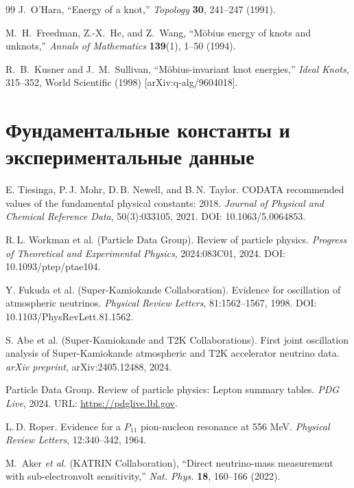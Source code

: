 \documentclass[11pt,a4paper]{article}
\begin{document}
\begin{thebibliography}{99}
		 J.~O'Hara, ``Energy of a knot,''
		\textit{Topology}
		\textbf{30}, 241--247 (1991).
		
		 M.~H.~Freedman, Z.-X.~He, and Z.~Wang, ``Möbius energy of knots and unknots,''
		\textit{Annals of Mathematics}
		\textbf{139}(1), 1--50 (1994).
		
		 R.~B.~Kusner and J.~M.~Sullivan, ``Möbius-invariant knot energies,''
		\textit{Ideal Knots}, 315--352, World Scientific (1998) [arXiv:q-alg/9604018].
		
		\section*{Фундаментальные константы и экспериментальные данные}
		
		E. Tiesinga, P.\,J. Mohr, D.\,B. Newell, and B.\,N. Taylor.
		\newblock CODATA recommended values of the fundamental physical constants: 2018.
		\newblock \textit{Journal of Physical and Chemical Reference Data}, 50(3):033105, 2021.
		\newblock DOI: 10.1063/5.0064853.
		
		R.\,L. Workman et al. (Particle Data Group).
		\newblock Review of particle physics.
		\newblock \textit{Progress of Theoretical and Experimental Physics}, 2024:083C01, 2024.
		\newblock DOI: 10.1093/ptep/ptae104.
		
		Y. Fukuda et al. (Super-Kamiokande Collaboration).
		\newblock Evidence for oscillation of atmospheric neutrinos.
		\newblock \textit{Physical Review Letters}, 81:1562--1567, 1998.
		\newblock DOI: 10.1103/PhysRevLett.81.1562.
		
		S. Abe et al. (Super-Kamiokande and T2K Collaborations).
		\newblock First joint oscillation analysis of Super-Kamiokande atmospheric and T2K accelerator neutrino data.
		\newblock \textit{arXiv preprint}, arXiv:2405.12488, 2024.
		
		Particle Data Group.
		 Review of particle physics: Lepton summary tables.
		\newblock \textit{PDG Live}, 2024.
		\newblock URL: \url{https://pdglive.lbl.gov}.
		
		L.\,D. Roper.
		\newblock Evidence for a $P_{11}$ pion-nucleon resonance at 556 MeV.
		\newblock \textit{Physical Review Letters}, 12:340--342, 1964.
		
		M.~Aker \textit{et al.} (KATRIN Collaboration), ``Direct neutrino-mass measurement with sub-electronvolt sensitivity,'' \textit{Nat. Phys.} \textbf{18}, 160--166 (2022).
		

\end{thebibliography}
\end{document}
